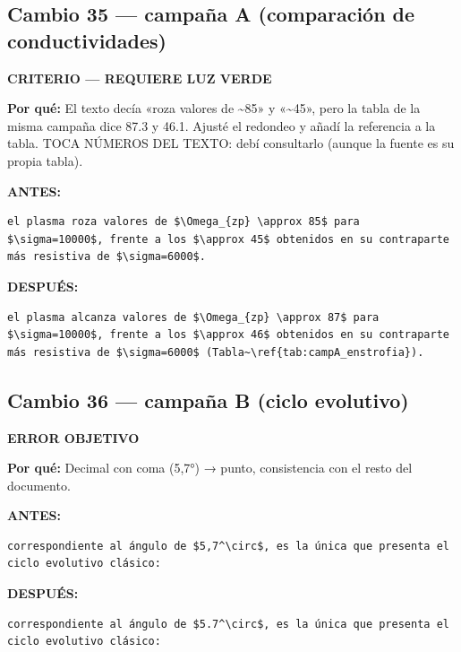 \documentclass[11pt,a4paper]{article}
\begin{document}
\subsection*{Cambio 35 --- campaña A (comparación de conductividades)}
\colorbox{critbg}{\textbf{\footnotesize CRITERIO --- REQUIERE LUZ VERDE}}

\textbf{Por qué:} El texto decía «roza valores de \textasciitilde{}85» y «\textasciitilde{}45», pero la tabla de la misma campaña dice 87.3 y 46.1. Ajusté el redondeo y añadí la referencia a la tabla. TOCA NÚMEROS DEL TEXTO: debí consultarlo (aunque la fuente es su propia tabla).

\textcolor{antesline}{\textbf{ANTES:}}
\begin{Verbatim}[breaklines=true, breakanywhere=true, fontsize=\small, frame=leftline, rulecolor=\color{antesline}, framerule=1.2pt]
el plasma roza valores de $\Omega_{zp} \approx 85$ para $\sigma=10000$, frente a los $\approx 45$ obtenidos en su contraparte más resistiva de $\sigma=6000$.
\end{Verbatim}
\textcolor{despline}{\textbf{DESPUÉS:}}
\begin{Verbatim}[breaklines=true, breakanywhere=true, fontsize=\small, frame=leftline, rulecolor=\color{despline}, framerule=1.2pt]
el plasma alcanza valores de $\Omega_{zp} \approx 87$ para $\sigma=10000$, frente a los $\approx 46$ obtenidos en su contraparte más resistiva de $\sigma=6000$ (Tabla~\ref{tab:campA_enstrofia}).
\end{Verbatim}

\subsection*{Cambio 36 --- campaña B (ciclo evolutivo)}
\colorbox{okbg}{\textbf{\footnotesize ERROR OBJETIVO}}

\textbf{Por qué:} Decimal con coma (5,7°) → punto, consistencia con el resto del documento.

\textcolor{antesline}{\textbf{ANTES:}}
\begin{Verbatim}[breaklines=true, breakanywhere=true, fontsize=\small, frame=leftline, rulecolor=\color{antesline}, framerule=1.2pt]
correspondiente al ángulo de $5,7^\circ$, es la única que presenta el ciclo evolutivo clásico:
\end{Verbatim}
\textcolor{despline}{\textbf{DESPUÉS:}}
\begin{Verbatim}[breaklines=true, breakanywhere=true, fontsize=\small, frame=leftline, rulecolor=\color{despline}, framerule=1.2pt]
correspondiente al ángulo de $5.7^\circ$, es la única que presenta el ciclo evolutivo clásico:
\end{Verbatim}
\end{document}
